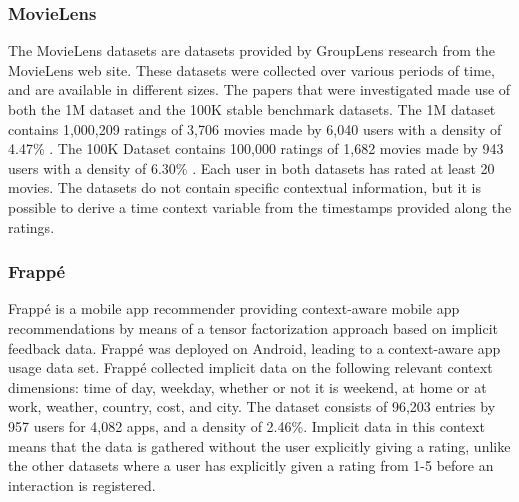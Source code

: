 \subsubsection{MovieLens}
The MovieLens\cite{movielens} datasets are datasets provided by GroupLens research from the MovieLens web site.
These datasets were collected over various periods of time, and are available in different sizes.
The papers that were investigated made use of both the 1M dataset and the 100K stable benchmark datasets.
The 1M dataset contains 1,000,209 ratings of 3,706 movies made by 6,040 users with a density of 4.47\% \cite{MovieLens2015}.
The 100K Dataset contains 100,000 ratings of 1,682 movies made by 943 users with a density of 6.30\% \cite{MovieLens2015}.
Each user in both datasets has rated at least 20 movies.
The datasets do not contain specific contextual information, but it is possible to derive a time context variable from the timestamps provided along the ratings.

\subsubsection{Frappé}
Frappé\cite{baltrunas2015frappe} is a mobile app recommender providing context-aware mobile app recommendations by means of a tensor factorization approach based on implicit feedback data.
Frappé was deployed on Android, leading to a context-aware app usage data set.
Frappé collected implicit data on the following relevant context dimensions: time of day, weekday, whether or not it is weekend, at home or at work, weather, country, cost, and city. 
The dataset consists of 96,203 entries by 957 users for 4,082 apps, and a density of 2.46\%.
Implicit data in this context means that the data is gathered without the user explicitly giving a rating, unlike the other datasets where a user has explicitly given a rating from 1-5 before an interaction is registered.

